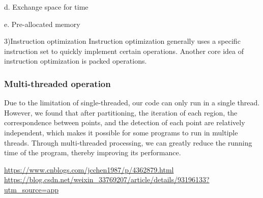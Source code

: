 \documentclass{apmcmthesis}
\begin{document}
d. Exchange space for time


e. Pre-allocated memory


3)Instruction optimization
Instruction optimization generally uses a specific instruction set to quickly implement certain operations. Another core idea of instruction optimization is packed operations.

\subsubsection{Multi-threaded operation}
Due to the limitation of single-threaded, our code can only run in a single thread. However, we found that after partitioning, the iteration of each region, the correspondence between points, and the detection of each point are relatively independent, which makes it possible for some programs to run in multiple threads. Through multi-threaded processing, we can greatly reduce the running time of the program, thereby improving its performance.




\begin{thebibliography}{9}%
    \url{https://www.cnblogs.com/jcchen1987/p/4362879.html}
    \url{https://blog.csdn.net/weixin_33769207/article/details/93196133?utm_source=app}
\end{thebibliography}

\newpage
\end{document}
